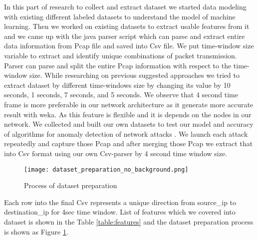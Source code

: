 In this part of research to collect and extract dataset we started data modeling with existing different labeled datasets to understand the model of machine learning. Then we worked on existing datasets to extract usable features from it and we came up with the java parser script which can parse and extract entire data information from Pcap file and saved into Csv file. We put time-window size variable to extract and identify unique combinations of packet transmission. Parser can parse and split the entire Pcap information with respect to the time-window size. While researching on previous suggested approaches we tried to extract dataset by different time-windows size by changing its value by 10 seconds, 1 seconds, 7 seconds, and 5 seconds. We observe that 4 second time frame is more preferable in our network architecture as it generate more accurate result with weka. As this feature is flexible and it is depends on the nodes in our network. We collected and built our own datasets to test our model and accuracy of algorithms for anomaly detection of network attacks \cite{DMnIDS}. We launch each attack repeatedly and capture those Pcap and after merging those Pcap we extract that into Csv format using our own Csv-parser by 4 second time window size.

\begin{figure}[h!]
\texttt{[image: dataset\_preparation\_no\_background.png]}
\caption{Process of dataset preparation}
\label{fig:dataset_prepare}
\end{figure}

\noindent Each row into the final Csv represents a unique direction from source\_ip to destination\_ip for 4sec time window. List of features which we covered into dataset is shown in the Table \ref{table:features} and the dataset preparation process is shown as Figure \ref{fig:dataset_prepare}.

